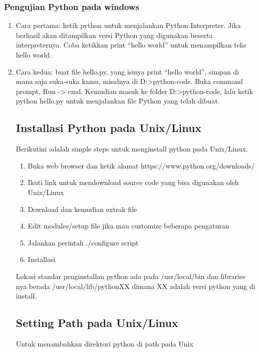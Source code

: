 \subsubsection{Pengujian Python pada windows}
	\begin{enumerate}
	\item Cara pertama: ketik python untuk menjalankan Python Interpreter. 
	      Jika berhasil akan ditampilkan versi Python yang digunakan beserta interpreternya. 
	      Coba ketikkan print “hello world” untuk menampilkan teks hello world.
	\item Cara kedua: buat file hello.py, yang isinya print “hello world”, 
	      simpan di mana saja suka-suka kamu, misalnya di D:>python-code. Buka command prompt, Run -> cmd. 
	      Kemudian masuk ke folder D:>python-code, lalu ketik python hello.py untuk menjalankan file Python yang telah dibuat.

\subsection{Installasi Python pada Unix/Linux}
	Berikutini adalah simple steps untuk menginstall python pada Unix/Linux.
	\begin{enumerate}
	\item Buka web browser dan ketik alamat https://www.python.org/downloads/
	\item Ikuti link untuk mendownload source code yang bisa digunakan oleh Unix/Linux
	\item Download dan kemudian extrak file
	\item Edit modules/setup file jika mau customize beberapa pengaturan
	\item Jalankan perintah ./configure script
	\item Installasi 
	\end{enumerate}
Lokasi standar penginstallan python ada pada /usr/local/bin dan libraries nya berada 
/usr/local/lib/pythonXX dimana XX adalah versi python yang di install.
\subsection{Setting Path pada Unix/Linux}
Untuk menambahkan direktori python di path pada Unix



\end{enumerate}
